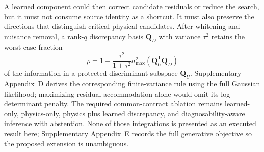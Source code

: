 A learned component could then correct candidate residuals or reduce the search, but it must not consume source identity as a shortcut. It must also preserve the directions that distinguish critical physical candidates. After whitening and nuisance removal, a rank-$q$ discrepancy basis $\bm Q_D$ with variance $\tau^2$ retains the worst-case fraction
\begin{equation}
 \rho=1-\frac{\tau^2}{1+\tau^2}
 \sigma_{\max}^2(\bm Q_U^{\mathsf T}\bm Q_D)
 \label{eq:discrepancy-retention-main}
\end{equation}
of the information in a protected discriminant subspace $\bm Q_U$. Supplementary Appendix~D derives the corresponding finite-variance rule using the full Gaussian likelihood; maximizing residual accommodation alone would omit its log-determinant penalty. The required common-contract ablation remains learned-only, physics-only, physics plus learned discrepancy, and diagnosability-aware inference with abstention. None of those integrations is presented as an executed result here; Supplementary Appendix~E records the full generative objective so the proposed extension is unambiguous.
